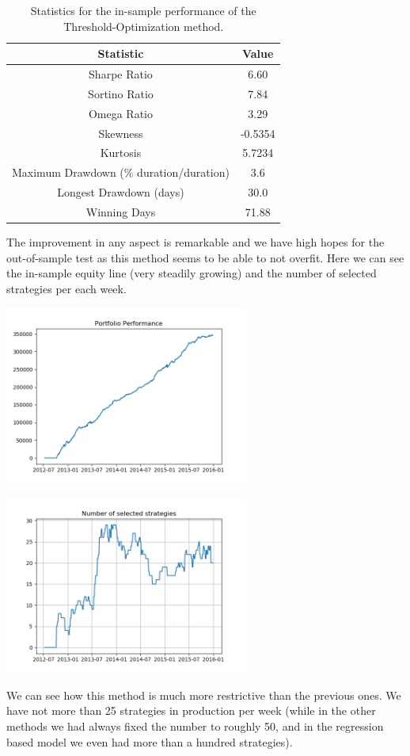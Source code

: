 \begin{table}
	\centering
	\begin{tabular}{c|c}
		\textbf{Statistic} & \textbf{Value} \\\hline
		Sharpe Ratio & 6.60 \\ 
		Sortino Ratio & 7.84 \\ 
		Omega Ratio & 3.29 \\ 
		Skewness & -0.5354 \\ 
		Kurtosis & 5.7234 \\ 
		Maximum Drawdown (\% duration/duration) & 3.6 \\ 
		Longest Drawdown (days) & 30.0 \\ 
		Winning Days & 71.88 \\ 
	\end{tabular}
	\caption{\label{tab:widgets} Statistics for the in-sample performance of the Threshold-Optimization method.}
\end{table}

The improvement in any aspect is remarkable and we have high hopes for the out-of-sample test as this method seems to be able to not overfit.
Here we can see the in-sample equity line (very steadily growing) and the number of selected strategies per each week.

\begin{center}
	\centering
	\includegraphics[width=0.6\textwidth]{GridSearches/Threshold_Backtest/In_sample_perf.png}
	\label{Average_Drawdown_in_sample}
\end{center}


\begin{center}
	\centering
	\includegraphics[width=0.6\textwidth]{GridSearches/Threshold_Backtest/num_strats_in_sample.png}
	\label{Average_Drawdown_in_sample}
\end{center}

We can see how this method is much more restrictive than the previous ones. We have not more than 25 strategies in production per week (while in the other methods we had always fixed the number to roughly 50, and in the regression based model we even had more than a hundred strategies).
